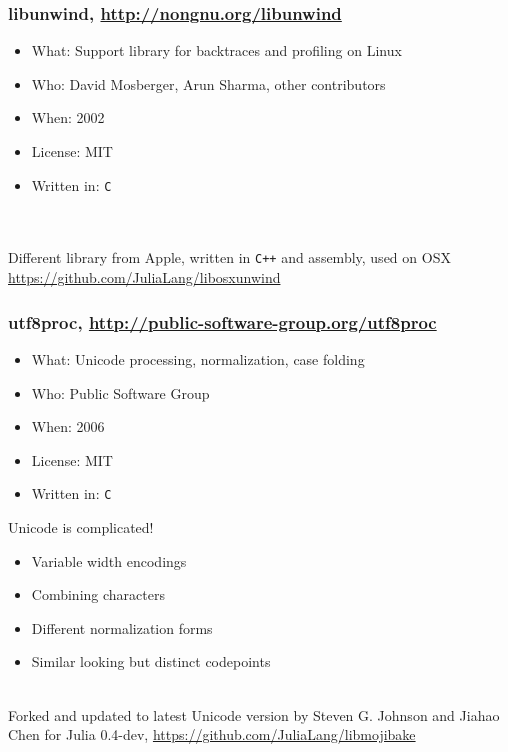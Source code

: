 \documentclass[compressed,dvips,letter]{beamer}
\begin{document}
%
%

\begin{frame}\frametitle{libunwind, \url{http://nongnu.org/libunwind}}
\begin{itemize}
\item What: Support library for backtraces and profiling on Linux
\item Who: David Mosberger, Arun Sharma, other contributors
\item When: 2002
\item License: MIT
\item Written in: \texttt{C}
\end{itemize}

~\\
~\\
Different library from Apple, written in \texttt{C++} and assembly, used on OSX \url{https://github.com/JuliaLang/libosxunwind}

\end{frame}

%
%

\begin{frame}\frametitle{utf8proc, {\small \url{http://public-software-group.org/utf8proc}}}
\begin{itemize}
\item What: Unicode processing, normalization, case folding
\item Who: Public Software Group
\item When: 2006
\item License: MIT
\item Written in: \texttt{C}
\end{itemize}


Unicode is complicated!
\begin{itemize}
\item Variable width encodings
\item Combining characters
\item Different normalization forms
\item Similar looking but distinct codepoints
\end{itemize}

~\\
Forked and updated to latest Unicode version by Steven G. Johnson and Jiahao Chen for Julia 0.4-dev, {\footnotesize \url{https://github.com/JuliaLang/libmojibake}}

\end{frame}
\end{document}
